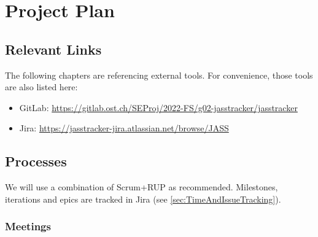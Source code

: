 \chapter{Project Plan}


\section{Relevant Links}

The following chapters are referencing external tools. For convenience, those tools are also listed here:

\begin{itemize}
    \item GitLab: \url{https://gitlab.ost.ch/SEProj/2022-FS/g02-jasstracker/jasstracker}
    \item Jira: \url{https://jasstracker-jira.atlassian.net/browse/JASS}
\end{itemize}

\section{Processes}

We will use a combination of Scrum+RUP as recommended.
Milestones, iterations and epics are tracked in Jira (see \ref{sec:TimeAndIssueTracking}).

\subsection*{Meetings}

